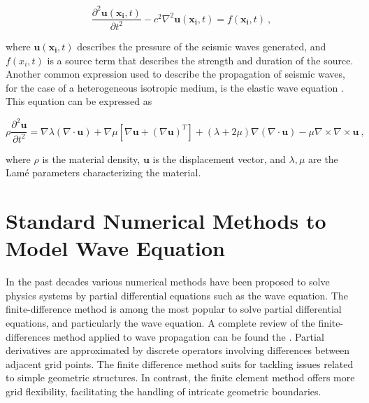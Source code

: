 \documentclass[11pt,twoside]{article}
\begin{document}
\begin{equation}
\frac{\partial^2 \boldsymbol{u}(\boldsymbol{x_i}, t)}{\partial t^2} - c^{2} \nabla^2 \boldsymbol{u}(\boldsymbol{x_i}, t) =
 f(\boldsymbol{x_i}, t) \ ,
\label{acoustic}
\end{equation}

where \( \boldsymbol{u}(\boldsymbol{x_i}, t) \) describes the pressure of the seismic waves generated, and \( f(x_i, t) \) is a 
source term that describes the strength and duration of the source. Another common expression used to describe the propagation of 
seismic waves, for the case of a heterogeneous isotropic medium, is the elastic wave equation \citep{moseley_fast_2018,lehmann_fourier_2023}. 
This equation can be expressed as 

\begin{equation}
\rho \frac{\partial^2 \boldsymbol{u}}{\partial t^2} = \nabla \lambda (\nabla \cdot \boldsymbol{u}) + \nabla \mu \left[\nabla \boldsymbol{u} + (\nabla \boldsymbol{u})^T\right] + (\lambda + 2\mu) \nabla (\nabla \cdot \boldsymbol{u}) - \mu \nabla \times \nabla \times \boldsymbol{u} \ ,
\label{elastic}
\end{equation}

where $\rho$ is the material density, $\boldsymbol{u}$ is the displacement vector, and $\lambda, \mu$ are the Lamé parameters 
characterizing the material.

\section{Standard Numerical Methods to Model Wave Equation}\label{sec:tnm}

In the past decades various numerical methods have been proposed to solve physics systems by partial differential equations such as the 
wave equation. The finite-difference method is among the most popular to solve partial differential equations, and particularly the wave 
equation. A complete review of the finite-differences method applied to wave propagation can be found the . 
Partial derivatives are approximated by discrete operators involving differences between adjacent grid points. The finite difference 
method suits for tackling issues related to simple geometric structures. In contrast, the finite element method offers more grid 
flexibility, facilitating the handling of intricate geometric boundaries.
\end{document}
